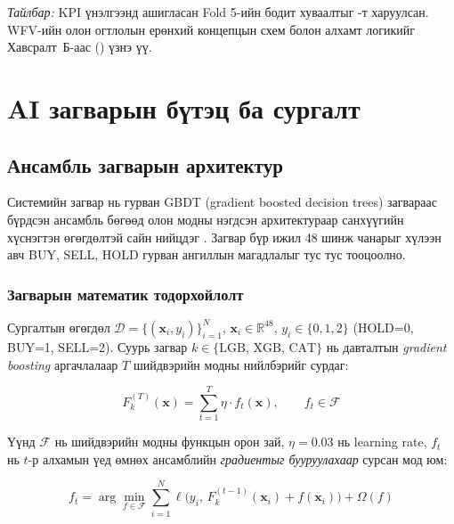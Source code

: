 \noindent\textit{Тайлбар:} KPI үнэлгээнд ашигласан Fold 5-ийн бодит хуваалтыг -т харуулсан. WFV-ийн олон огтлолын ерөнхий концепцын схем болон алхамт логикийг Хавсралт~Б-аас () үзнэ үү.

\section{AI загварын бүтэц ба сургалт}

\subsection{Ансамбль загварын архитектур}

Системийн загвар нь гурван GBDT (gradient boosted decision trees) загвараас бүрдсэн ансамбль бөгөөд олон модны нэгдсэн архитектураар санхүүгийн хүснэгтэн өгөгдөлтэй сайн нийцдэг \cite{chen2016xgboost}. Загвар бүр ижил 48 шинж чанарыг хүлээн авч BUY, SELL, HOLD гурван ангиллын магадлалыг тус тус тооцоолно.

\subsubsection{Загварын математик тодорхойлолт}
\label{sec:math_formulation}

Сургалтын өгөгдөл $\mathcal{D} = \{(\mathbf{x}_i, y_i)\}_{i=1}^{N}$, $\mathbf{x}_i \in \mathbb{R}^{48}$,
$y_i \in \{0, 1, 2\}$ (HOLD=0, BUY=1, SELL=2). Суурь загвар $k \in \{\text{LGB, XGB, CAT}\}$ нь
давталтын \emph{gradient boosting} аргачлалаар $T$ шийдвэрийн модны нийлбэрийг сурдаг:

\begin{equation}
F_k^{(T)}(\mathbf{x}) = \sum_{t=1}^{T} \eta \cdot f_t(\mathbf{x}), \qquad f_t \in \mathcal{F}
\label{eq:gbdt_sum}
\end{equation}

\noindent Үүнд $\mathcal{F}$ нь шийдвэрийн модны функцын орон зай, $\eta=0.03$ нь
learning rate, $f_t$ нь $t$-р алхамын үед өмнөх ансамблийн \emph{градиентыг
бууруулахаар} сурсан мод юм:

\begin{equation}
f_t = \arg\min_{f \in \mathcal{F}} \sum_{i=1}^{N} \ell\bigl(y_i,\, F_k^{(t-1)}(\mathbf{x}_i) + f(\mathbf{x}_i)\bigr) + \Omega(f)
\label{eq:boosting_step}
\end{equation}

